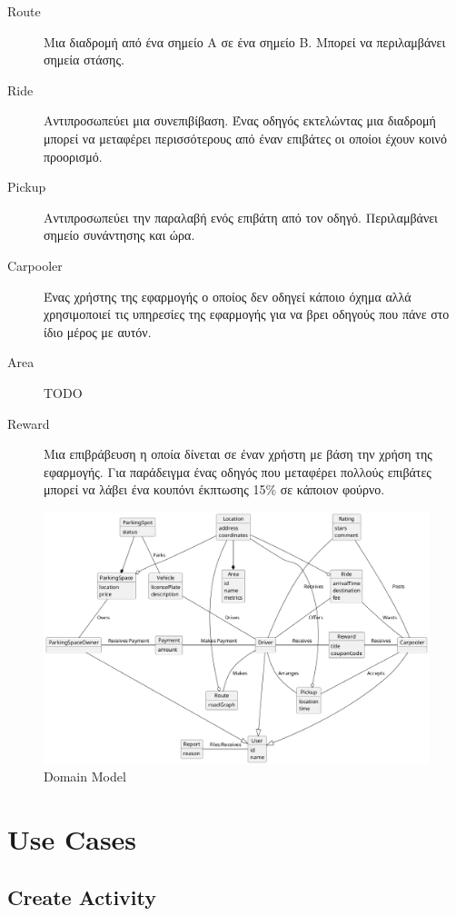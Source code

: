 \documentclass[11pt]{article}
\begin{document}
\begin{description}
    \item[Route]
        Μια διαδρομή από ένα σημείο Α σε ένα σημείο Β. Μπορεί να περιλαμβάνει
        σημεία στάσης.
    \item[Ride]
        Αντιπροσωπεύει μια συνεπιβίβαση. Ένας οδηγός εκτελώντας μια διαδρομή
        μπορεί να μεταφέρει περισσότερους από έναν επιβάτες οι οποίοι έχουν
        κοινό προορισμό.
    \item[Pickup]
        Αντιπροσωπεύει την παραλαβή ενός επιβάτη από τον οδηγό. Περιλαμβάνει
        σημείο συνάντησης και ώρα.
    \item[Carpooler]
        Ένας χρήστης της εφαρμογής ο οποίος δεν οδηγεί κάποιο όχημα αλλά
        χρησιμοποιεί τις υπηρεσίες της εφαρμογής για να βρει οδηγούς που πάνε
        στο ίδιο μέρος με αυτόν.
    \item[Area]
        TODO
    \item[Reward]
        Μια επιβράβευση η οποία δίνεται σε έναν χρήστη με βάση την χρήση της
        εφαρμογής. Για παράδειγμα ένας οδηγός που μεταφέρει πολλούς επιβάτες
        μπορεί να λάβει ένα κουπόνι έκπτωσης 15\% σε κάποιον φούρνο.
\end{description}

\begin{figure}
    \centering
    \includegraphics[width=\textwidth]{domain-model}
    \caption{Domain Model}
\end{figure}

\newpage

\section{Use Cases}

\subsection{Create Activity}
\end{document}
